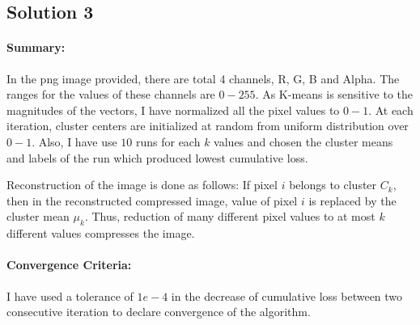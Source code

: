 \subsection*{Solution 3}
\paragraph{Summary:} In the png image provided, there are total 4 channels, R, G, B and Alpha. The ranges for the values of these channels are $0-255$. As K-means is sensitive to the magnitudes of the vectors, I have normalized all the pixel values to $0-1$. At each iteration, cluster centers are initialized at random from uniform distribution over $0-1$. Also, I have use $10$ runs for each $k$ values and chosen the cluster means and labels of the run which produced lowest cumulative loss.

Reconstruction of the image is done as follows: If pixel $i$ belongs to cluster $C_k$, then in the reconstructed compressed image, value of pixel $i$ is replaced by the cluster mean $\mu_k$. Thus, reduction of many different pixel values to at most $k$ different values compresses the image.

\paragraph{Convergence Criteria:} I have used a tolerance of $1e-4$ in the decrease of cumulative loss between two consecutive iteration to declare convergence of the algorithm.


